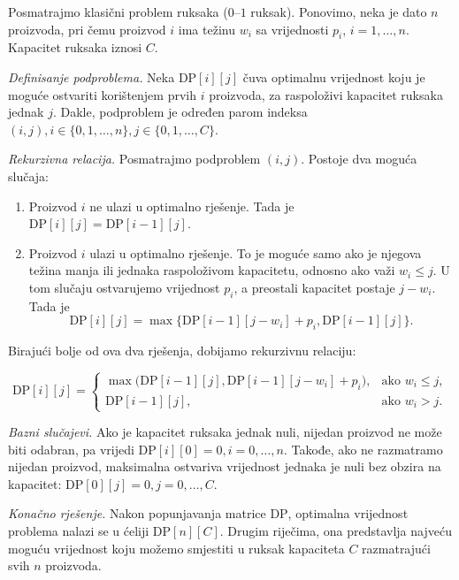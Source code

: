 \begin{solution}
	
	Posmatrajmo klasični problem ruksaka ($0$--$1$ ruksak). Ponovimo, neka je dato $n$ proizvoda, pri čemu proizvod $i$ ima težinu $w_i$ sa vrijednosti $p_i$,  $i=1,\ldots,n$. Kapacitet ruksaka iznosi $C$.
	
	\medskip
	
	\textit{Definisanje podproblema.} Neka $\textrm{DP}[i][j]$ čuva optimalnu vrijednost koju je moguće ostvariti korištenjem prvih $i$ proizvoda, za raspoloživi kapacitet ruksaka jednak $j$.  Dakle, podproblem je određen parom indeksa $
	(i,j), 
	i \in \{0,1,\ldots,n\}, 
	j \in \{0,1,\ldots,C\}.$
	
	\medskip
	
	\textit{Rekurzivna relacija.} Posmatrajmo podproblem $(i,j)$.	Postoje dva moguća slučaja:
	
	\begin{enumerate}
		\item Proizvod $i$ ne ulazi u optimalno rješenje. Tada je
	    $  \textrm{DP}[i][j] = \textrm{DP}[i-1][j].$
		\item Proizvod $i$ ulazi u optimalno rješenje. To je moguće samo ako je njegova težina manja ili jednaka raspoloživom kapacitetu, odnosno ako važi $w_i \leq j$. U tom slučaju ostvarujemo vrijednost $p_i$, a preostali kapacitet postaje $j-w_i$. Tada je
		$$
		\textrm{DP}[i][j] =\max\{ \textrm{DP}[i-1][j-w_i] + p_i, \textrm{DP}[i-1][j] \}.
		$$
		
	\end{enumerate}
	
	Birajući bolje od ova dva rješenja, dobijamo rekurzivnu relaciju:
	
	$$
	\textrm{DP}[i][j] =
	\begin{cases}
		\max\bigl(\textrm{DP}[i-1][j],\textrm{DP}[i-1][j-w_i] + p_i\bigr),
		& \text{ako } w_i \leq j, \\
		\textrm{DP}[i-1][j],
		& \text{ako } w_i > j.
	\end{cases}
	$$
	\medskip
	
	\textit{Bazni slučajevi.} Ako je kapacitet ruksaka jednak nuli, nijedan proizvod ne može biti odabran, pa vrijedi $
	\textrm{DP}[i][0]=0, i=0,\ldots,n.$  Takođe, ako ne razmatramo nijedan proizvod, maksimalna ostvariva vrijednost jednaka je nuli bez obzira na kapacitet: $\textrm{DP}[0][j]=0, j=0,\ldots,C.$
	
	\medskip
	
	\textit{Konačno rješenje.}	Nakon popunjavanja matrice $\textrm{DP}$, optimalna vrijednost problema nalazi se u ćeliji $
	\textrm{DP}[n][C].$	Drugim riječima, ona predstavlja najveću moguću vrijednost koju možemo smjestiti u ruksak kapaciteta $C$ razmatrajući svih $n$ proizvoda.
	

\end{solution}
